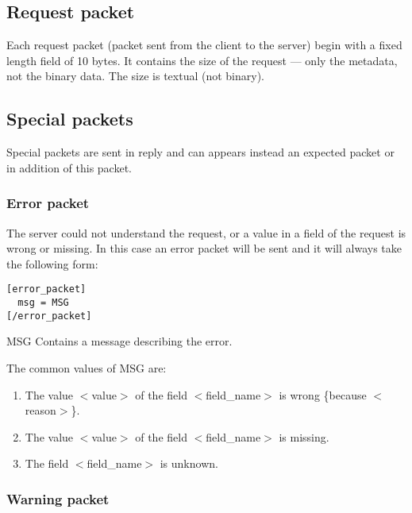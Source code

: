 \subsection{Request packet}

Each request packet (packet sent from the client to the server) begin with a fixed length field of 10 bytes. It contains the size of the request — only the metadata, not the binary data. The size is textual (not binary).

\subsection{Special packets}
\label{wire:specialpackets}

Special packets are sent in reply and can appears instead an expected packet or in addition of this packet.

\subsubsection{Error packet}
\label{wire:specialpackets:errorpacket}

 The server could not understand the request, or a value in a field of the request is wrong or missing.
In this case an error packet will be sent and it will always take the following form:
\begin{lstlisting}
[error_packet]
  msg = MSG
[/error_packet]
\end{lstlisting}

\begin{description}
 \item MSG Contains a message describing the error.
\end{description}

The common values of MSG are:

\begin{enumerate}
 \item The value $<$value$>$ of the field $<$field\_name$>$ is wrong \{because $<$reason$>$\}.
 \item The value $<$value$>$ of the field $<$field\_name$>$ is missing.
 \item The field $<$field\_name$>$ is unknown.
\end{enumerate}

\subsubsection{Warning packet}
\label{wire:specialpackets:warningpacket}

